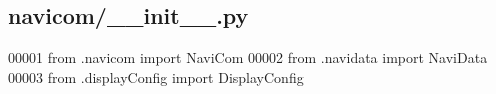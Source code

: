\hypertarget{____init_____8py_source}{
\subsection{navicom/\_\-\_\-init\_\-\_\-.py}
}

\begin{DoxyCode}
00001 \textcolor{keyword}{from} .navicom \textcolor{keyword}{import} NaviCom
00002 \textcolor{keyword}{from} .navidata \textcolor{keyword}{import} NaviData
00003 \textcolor{keyword}{from} .displayConfig \textcolor{keyword}{import} DisplayConfig
\end{DoxyCode}

